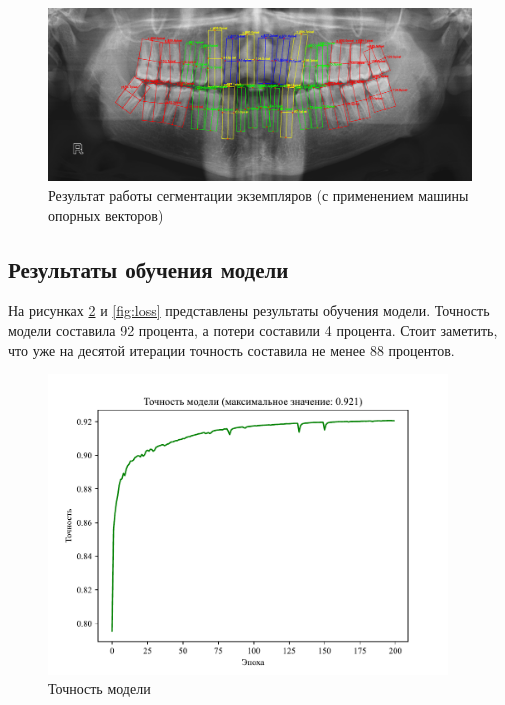 \begin{figure}[H]
	\centering
	\includegraphics[width=\textwidth]{img/segmented_svm.png}
	\caption{Результат работы сегментации экземпляров (с применением машины опорных векторов)}
	\label{fig:segmented_svm}
\end{figure}

\subsection{Результаты обучения модели}

На рисунках \ref{fig:accuracy} и \ref{fig:loss} представлены результаты обучения модели. Точность модели составила 92 процента, а потери составили 4 процента. Стоит заметить, что уже на десятой итерации точность составила не менее 88 процентов.

\begin{figure}[H]
	\centering
	\includegraphics[width=400px]{img/accuracy.pdf}
	\caption{Точность модели}
	\label{fig:accuracy}
\end{figure}

